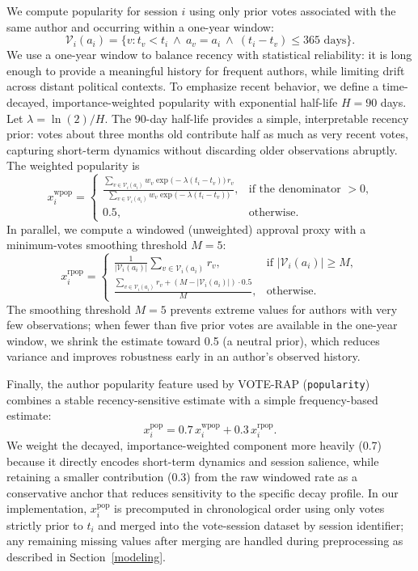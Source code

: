 \documentclass[review]{elsarticle}
\begin{document}
We compute popularity for session $i$ using only prior votes associated with the same author and occurring within a one-year window:
\[
\mathcal{V}_i(a_i) = \{ v : t_v < t_i \ \wedge \ a_v = a_i \ \wedge \ (t_i - t_v) \leq 365\text{ days} \}.
\]
We use a one-year window to balance recency with statistical reliability: it is long enough to provide a meaningful history for frequent authors, while limiting drift across distant political contexts. To emphasize recent behavior, we define a time-decayed, importance-weighted popularity with exponential half-life $H=90$ days. Let $\lambda = \ln(2)/H$. The 90-day half-life provides a simple, interpretable recency prior: votes about three months old contribute half as much as very recent votes, capturing short-term dynamics without discarding older observations abruptly. The weighted popularity is
\[
x^{\mathrm{wpop}}_i =
\begin{cases}
\frac{\sum\limits_{v \in \mathcal{V}_i(a_i)} w_v \exp\!\big(-\lambda (t_i-t_v)\big)\, r_v}
     {\sum\limits_{v \in \mathcal{V}_i(a_i)} w_v \exp\!\big(-\lambda (t_i-t_v)\big)}, & \text{if the denominator $>0$,}\\[8pt]
0.5, & \text{otherwise.}
\end{cases}
\]
In parallel, we compute a windowed (unweighted) approval proxy with a minimum-votes smoothing threshold $M=5$:
\[
x^{\mathrm{rpop}}_i =
\begin{cases}
\frac{1}{|\mathcal{V}_i(a_i)|}\sum\limits_{v \in \mathcal{V}_i(a_i)} r_v, & \text{if } |\mathcal{V}_i(a_i)| \ge M,\\[6pt]
\frac{\sum\limits_{v \in \mathcal{V}_i(a_i)} r_v + (M-|\mathcal{V}_i(a_i)|)\cdot 0.5}{M}, & \text{otherwise.}
\end{cases}
\]
The smoothing threshold $M=5$ prevents extreme values for authors with very few observations; when fewer than five prior votes are available in the one-year window, we shrink the estimate toward 0.5 (a neutral prior), which reduces variance and improves robustness early in an author's observed history.

Finally, the author popularity feature used by VOTE-RAP (\texttt{popularity}) combines a stable recency-sensitive estimate with a simple frequency-based estimate:
\[
x^{\mathrm{pop}}_i = 0.7\,x^{\mathrm{wpop}}_i + 0.3\,x^{\mathrm{rpop}}_i.
\]
We weight the decayed, importance-weighted component more heavily (0.7) because it directly encodes short-term dynamics and session salience, while retaining a smaller contribution (0.3) from the raw windowed rate as a conservative anchor that reduces sensitivity to the specific decay profile. In our implementation, $x^{\mathrm{pop}}_i$ is precomputed in chronological order using only votes strictly prior to $t_i$ and merged into the vote-session dataset by session identifier; any remaining missing values after merging are handled during preprocessing as described in Section~\ref{modeling}.
\end{document}
